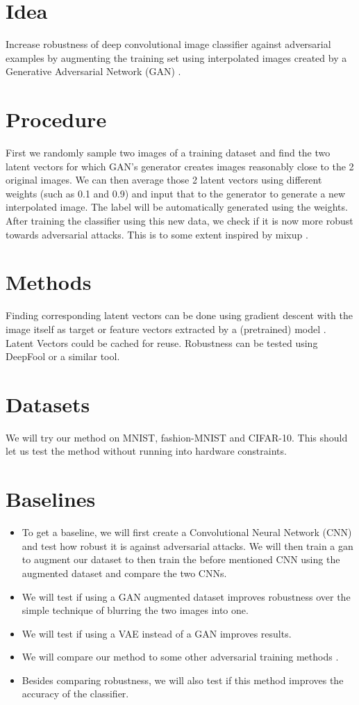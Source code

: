 \documentclass{article}
\begin{document}
	\section{Idea}
	Increase robustness of deep convolutional image classifier against adversarial examples \cite{advExamples} by augmenting the training set using interpolated images created by a Generative Adversarial Network (GAN) \cite{gan}.
	
	\section{Procedure}
	First we randomly sample two images of a training dataset and find the two latent vectors for which GAN's generator creates images reasonably close to the 2 original images. We can then average those 2 latent vectors using different weights (such as 0.1 and 0.9) and input that to the generator to generate a new interpolated image. The label will be automatically generated using the weights. After training the classifier using this new data, we check if it is now more robust towards adversarial attacks. This is to some extent inspired by mixup \cite{mixup2}\cite{mixup1}.  
	
	\section{Methods}
	Finding corresponding latent vectors can be done using gradient descent with the image itself as target \cite{latentVector} or feature vectors extracted by a (pretrained) model \cite{ytLatentVector}. Latent Vectors could be cached for reuse.
	Robustness can be tested using DeepFool \cite{deepFool} or a similar tool.
	
	\section{Datasets}
	We will try our method on MNIST, fashion-MNIST and CIFAR-10. This should let us test the method without running into hardware constraints.
	
	\section{Baselines}
	\begin{itemize}
		\item To get a baseline, we will first create a Convolutional Neural Network (CNN) and test how robust it is against adversarial attacks. We will then train a gan to augment our dataset to then train the before mentioned CNN using the augmented dataset and compare the two CNNs.
		\item We will test if using a GAN augmented dataset improves robustness over the simple technique of blurring the two images into one.
		\item We will test if using a VAE instead of a GAN improves results.
		\item We will compare our method to some other adversarial training methods \cite{adv}\cite{gat}.
		\item Besides comparing robustness, we will also test if this method improves the accuracy of the classifier.
	\end{itemize}
	
	
	
\end{document}
